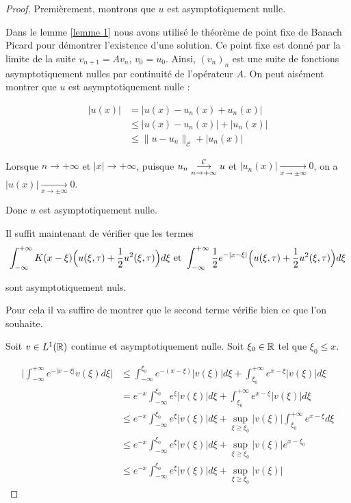 \begin{proof}

    Premièrement, montrons que $u$ est asymptotiquement nulle.

    Dans le lemme \ref{lemme 1} nous avons utilisé le théorème de point fixe de Banach Picard pour démontrer l'existence d'une solution.
    Ce point fixe est donné par la limite de la suite $v_{n+1} = Av_n$, $v_0 = u_0$. Ainsi, $(v_n)_n$ est une suite de fonctions 
    asymptotiquement nulles par continuité de l'opérateur $A$. 
    On peut aisément montrer que $u$ est asymptotiquement nulle :

    \begin{equation*}
    \begin{split}
        |u(x)| &= |u(x) - u_n(x) + u_n(x) | \\
        &\leq  |u(x) - u_n(x) | + |u_n(x)| \\
        &\leq \|u - u_n\|_{\mathcal{C}} + |u_n(x)|
    \end{split}
    \end{equation*}

    Lorsque $n \longrightarrow +\infty$ et $|x| \longrightarrow +\infty$, puisque $u_n \overunderset{\mathcal{C}}{n \rightarrow +\infty}{\longrightarrow} u$  et $|u_n(x) | \underset{x \rightarrow \pm \infty}{\longrightarrow} 0$,
    on a $|u(x)| \underset{x \rightarrow \pm \infty}{\longrightarrow} 0$.

    Donc $u$ est asymptotiquement nulle. 

    Il suffit maintenant de vérifier que les termes 
    $$\int_{-\infty}^{+\infty} K(x - \xi) \Bigl( u(\xi,\tau) + \frac{1}{2}u^2(\xi,\tau) \Bigr) d\xi \text{ et } \int_{-\infty}^{+\infty} \frac{1}{2} e^{-|x - \xi|} \Bigl( u(\xi,\tau) + \frac{1}{2}u^2(\xi,\tau) \Bigr) d\xi$$
    
    sont asymptotiquement nuls. 

    Pour cela il va suffire de montrer que le second terme vérifie bien ce que l'on souhaite.
    
    Soit $v \in L^1(\mathbb{R})$ continue et asymptotiquement nulle. Soit $\xi_0 \in \mathbb{R}$ tel que $\xi_0 \leq x$.

    \begin{equation*}
    \begin{split}
        \Big| \int_{-\infty}^{+\infty} e^{-|x - \xi|}v(\xi)d\xi \Big| &\leq \int_{-\infty}^{\xi_0} e^{-(x-\xi)}|v(\xi)|d\xi + \int_{\xi_0}^{+\infty} e^{x-\xi}|v(\xi)|d\xi \\
        &= e^{-x}\int_{-\infty}^{\xi_0} e^{\xi}|v(\xi)|d\xi + \int_{\xi_0}^{+\infty} e^{x-\xi}|v(\xi)|d\xi \\
        &\leq e^{-x}\int_{-\infty}^{\xi_0} e^{\xi}|v(\xi)|d\xi + \underset{\xi\geq \xi_0}{\sup} |v(\xi)| \int_{\xi_0}^{+\infty} e^{x - \xi} d\xi \\
        &\leq e^{-x}\int_{-\infty}^{\xi_0} e^{\xi}|v(\xi)|d\xi + \underset{\xi\geq \xi_0}{\sup} |v(\xi)| e^{x - \xi_0} \\
        &\leq e^{-x}\int_{-\infty}^{\xi_0} e^{\xi}|v(\xi)|d\xi + \underset{\xi\geq \xi_0}{\sup} |v(\xi)|
    \end{split}
    \end{equation*}


\end{proof}
